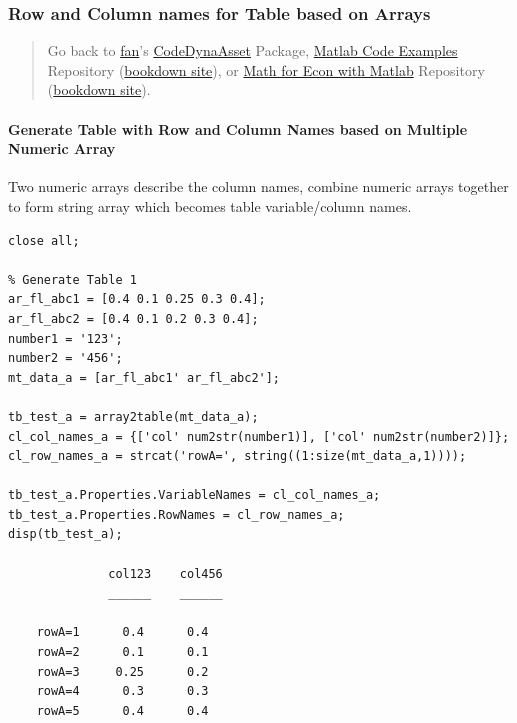 \documentclass[
]{book}
\begin{document}
\hypertarget{row-and-column-names-for-table-based-on-arrays}{%
\subsubsection{Row and Column names for Table based on Arrays}\label{row-and-column-names-for-table-based-on-arrays}}

\begin{quote}
Go back to \href{http://fanwangecon.github.io/}{fan}'s \href{https://fanwangecon.github.io/CodeDynaAsset/}{CodeDynaAsset} Package, \href{https://fanwangecon.github.io/M4Econ/}{Matlab Code Examples} Repository (\href{https://fanwangecon.github.io/M4Econ/bookdown}{bookdown site}), or \href{https://fanwangecon.github.io/Math4Econ/}{Math for Econ with Matlab} Repository (\href{https://fanwangecon.github.io/Math4Econ/bookdown}{bookdown site}).
\end{quote}

\hypertarget{generate-table-with-row-and-column-names-based-on-multiple-numeric-array}{%
\paragraph{Generate Table with Row and Column Names based on Multiple Numeric Array}\label{generate-table-with-row-and-column-names-based-on-multiple-numeric-array}}

Two numeric arrays describe the column names, combine numeric arrays
together to form string array which becomes table variable/column names.

\begin{verbatim}
close all;

% Generate Table 1
ar_fl_abc1 = [0.4 0.1 0.25 0.3 0.4];
ar_fl_abc2 = [0.4 0.1 0.2 0.3 0.4];
number1 = '123';
number2 = '456';
mt_data_a = [ar_fl_abc1' ar_fl_abc2'];

tb_test_a = array2table(mt_data_a);
cl_col_names_a = {['col' num2str(number1)], ['col' num2str(number2)]};
cl_row_names_a = strcat('rowA=', string((1:size(mt_data_a,1))));

tb_test_a.Properties.VariableNames = cl_col_names_a;
tb_test_a.Properties.RowNames = cl_row_names_a;
disp(tb_test_a);

              col123    col456
              ______    ______

    rowA=1      0.4      0.4  
    rowA=2      0.1      0.1  
    rowA=3     0.25      0.2  
    rowA=4      0.3      0.3  
    rowA=5      0.4      0.4  
\end{verbatim}
\end{document}
